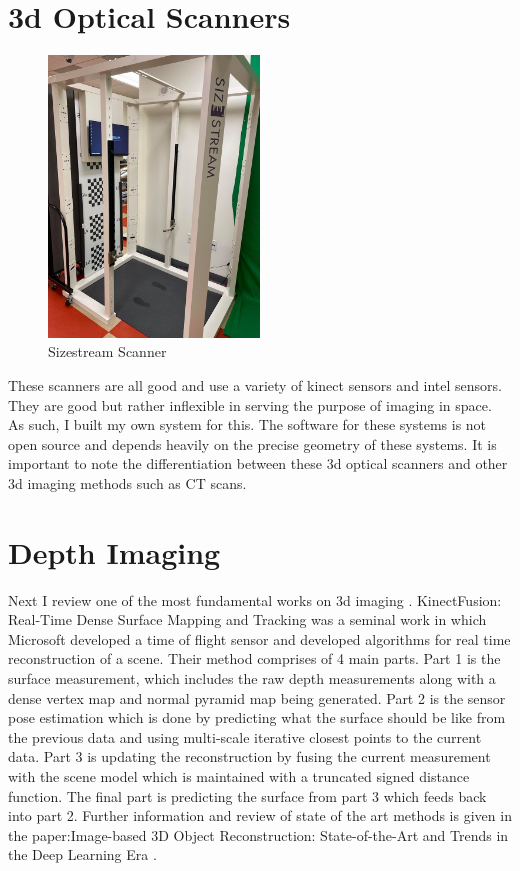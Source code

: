\section{3d Optical Scanners}
\begin{figure}[h]
	\caption{Sizestream Scanner}
	\centering
	\includegraphics[width=0.5\textwidth]{images/sizestream.jpg}
\end{figure}

These scanners are all good and use a variety of kinect sensors and intel sensors.
They are good but rather inflexible in serving the purpose of imaging in space. As such, I built my own system for this. The software for these systems is not open source and depends heavily on the precise geometry of these systems. It is important to note the differentiation between these 3d optical scanners and other 3d imaging methods such as CT scans.

\section{Depth Imaging}

Next I review one of the most fundamental works on 3d imaging \cite{izadi2011kinectfusion}. KinectFusion: Real-Time Dense Surface Mapping and Tracking was a seminal work in which Microsoft developed a time of flight sensor and developed algorithms for real time reconstruction of a scene. Their method comprises of 4 main parts. Part 1 is the surface measurement, which includes the raw depth measurements along with a dense vertex map and normal pyramid map being generated. Part 2 is the sensor pose estimation which is done by predicting what the surface should be like from the previous data and using multi-scale iterative closest points to the current data. Part 3 is updating the reconstruction by fusing the current measurement with the scene model which is maintained with a truncated signed distance function. The final part is predicting the surface from part 3 which feeds back into part 2.
Further information and review of state of the art methods is given in the paper:Image-based 3D Object Reconstruction: State-of-the-Art and Trends in the Deep Learning Era \cite{DBLP:journals/corr/abs-1906-06543}.

